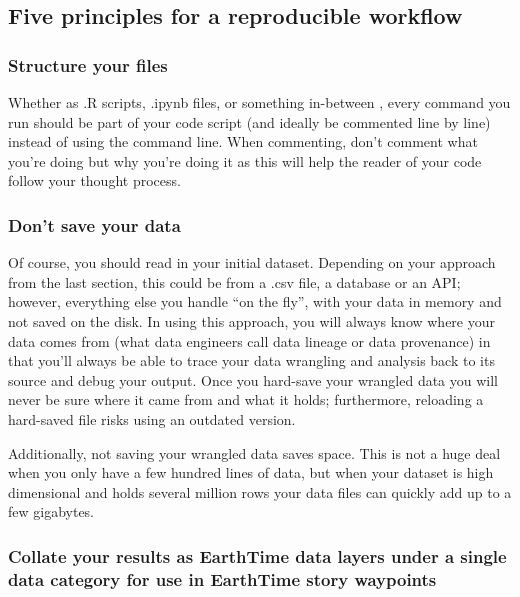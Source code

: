 \documentclass[
  12pt,
]{krantz}
\begin{document}
\hypertarget{five-principles-for-a-reproducible-workflow}{%
\subsection{Five principles for a reproducible workflow}\label{five-principles-for-a-reproducible-workflow}}

\hypertarget{structure-your-files}{%
\subsubsection*{Structure your files}\label{structure-your-files}}


Whether as .R scripts, .ipynb files, or something in-between , every command you run should be part of your code script (and ideally be commented line by line) instead of using the command line. When commenting, don't comment what you're doing but why you're doing it as this will help the reader of your code follow your thought process.

\hypertarget{dont-save-your-data}{%
\subsubsection*{Don't save your data}\label{dont-save-your-data}}


Of course, you should read in your initial dataset. Depending on your approach from the last section, this could be from a .csv file, a database or an API; however, everything else you handle ``on the fly'', with your data in memory and not saved on the disk. In using this approach, you will always know where your data comes from (what data engineers call data lineage or data provenance) in that you'll always be able to trace your data wrangling and analysis back to its source and debug your output. Once you hard-save your wrangled data you will never be sure where it came from and what it holds; furthermore, reloading a hard-saved file risks using an outdated version.

Additionally, not saving your wrangled data saves space. This is not a huge deal when you only have a few hundred lines of data, but when your dataset is high dimensional and holds several million rows your data files can quickly add up to a few gigabytes.

\hypertarget{collate-your-results-as-earthtime-data-layers-under-a-single-data-category-for-use-in-earthtime-story-waypoints}{%
\subsubsection*{Collate your results as EarthTime data layers under a single data category for use in EarthTime story waypoints}\label{collate-your-results-as-earthtime-data-layers-under-a-single-data-category-for-use-in-earthtime-story-waypoints}}
\end{document}
